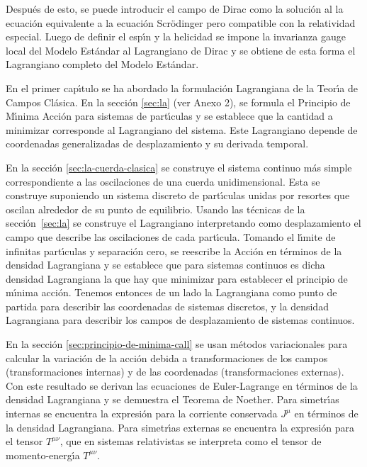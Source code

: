 Despu\'es de esto, se puede introducir el campo de Dirac como la soluci\'on al la ecuaci\'on equivalente a la ecuaci\'on Scr\"odinger pero compatible con la relatividad especial. Luego de definir el esp\'\i n y la helicidad se impone la invarianza gauge local del Modelo Est\'andar al Lagrangiano de Dirac y se obtiene de esta forma el Lagrangiano completo del Modelo Est\'andar.


En el primer cap\'\i tulo se ha abordado la formulaci\'on Lagrangiana de la Teor\'\i a de Campos Cl\'asica. En la secci\'on \ref{sec:la} (ver Anexo 2), se formula el Principio de M\'\i nima Acci\'on para sistemas de part\'\i culas y se establece que la cantidad a minimizar corresponde al Lagrangiano del sistema. Este Lagrangiano depende de coordenadas generalizadas de desplazamiento y su derivada temporal. 

En la secci\'on \ref{sec:la-cuerda-clasica} se construye el sistema continuo m\'as simple correspondiente a las oscilaciones de una cuerda unidimensional. Esta se construye suponiendo un sistema discreto de part\'\i culas unidas por resortes que oscilan alrededor de su punto de equilibrio. Usando las t\'ecnicas de la secci\'on~\ref{sec:la} se construye el Lagrangiano interpretando como desplazamiento el campo que describe las oscilaciones de cada part\'\i cula. Tomando el l\'\i mite de infinitas part\'\i culas y separaci\'on cero, se reescribe la Acci\'on en t\'erminos de la densidad Lagrangiana y se establece que para sistemas continuos es dicha densidad Lagrangiana la que hay que minimizar para establecer el principio de m\'\i nima acci\'on. Tenemos entonces de un lado la Lagrangiana como punto de partida para describir las coordenadas de sistemas discretos, y la densidad Lagrangiana para describir los campos de desplazamiento de sistemas continuos. 

En la secci\'on \ref{sec:principio-de-minima-call} se usan m\'etodos variacionales para calcular la variaci\'on de la acci\'on debida a transformaciones de los campos (transformaciones internas) y de las coordenadas (transformaciones externas). Con este resultado se derivan las ecuaciones de Euler-Lagrange en t\'erminos de la densidad Lagrangiana y se demuestra el  Teorema de Noether. Para simetr\'\i as internas se encuentra la expresi\'on para la corriente conservada $J^\mu$ en t\'erminos de la densidad Lagrangiana. Para simetr\'\i as externas se encuentra la expresi\'on para el tensor $T^{\mu\nu}$, que en sistemas relativistas se interpreta como el tensor de momento-energ\'\i a $T^{\mu\nu}$. 

